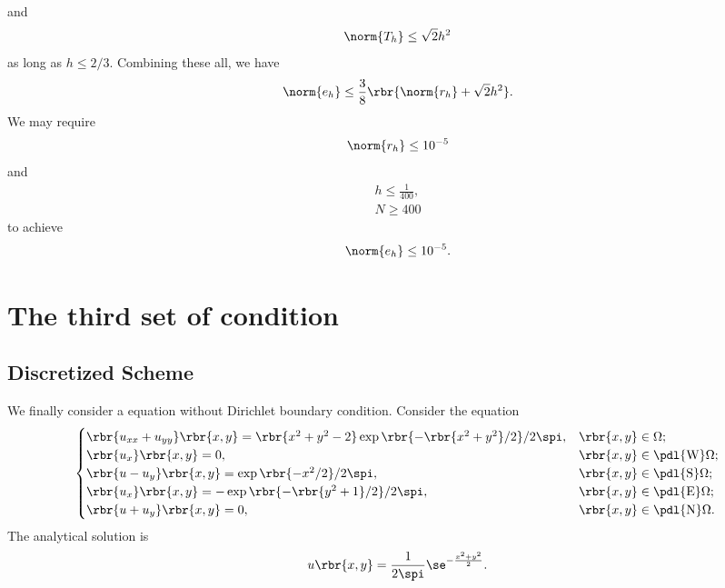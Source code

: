 \documentclass[english, nochinese]{pnote}
\begin{document}
and
\begin{equation}
\norm{T_h} \le \sqrt{2} h^2
\end{equation}
as long as $ h \le 2 / 3 $. Combining these all, we have
\begin{equation}
\norm{e_h} \le \frac{3}{8} \rbr{ \norm{r_h} + \sqrt{2} h^2 }.
\end{equation}
We may require
\begin{equation}
\norm{r_h} \le 10^{-5}
\end{equation}
and
\begin{gather}
h \le \frac{1}{400}, \\
N \ge 400
\end{gather}
to achieve
\begin{equation}
\norm{e_h} \le 10^{-5}.
\end{equation}

\section{The third set of condition}

\subsection{Discretized Scheme}

We finally consider a equation without Dirichlet boundary condition. Consider the equation
\begin{equation}
\begin{cases}
\rbr{ u_{ x x } + u_{ y y } } \rbr{ x, y } = \rbr{ x^2 + y^2 - 2 } \exp \rbr{ -\rbr{ x^2 + y^2 } / 2 } / 2 \spi, & \rbr{ x, y } \in \Omega; \\
\rbr{u_x} \rbr{ x, y } = 0, & \rbr{ x, y } \in \pdl{\text{W}} \Omega; \\
\rbr{ u - u_y } \rbr{ x, y }  = \exp \rbr{ -x^2 / 2 } / 2 \spi, & \rbr{ x, y } \in \pdl{\text{S}} \Omega; \\
\rbr{u_x} \rbr{ x, y } = -\exp \rbr{ -\rbr{ y^2 + 1 } / 2 } / 2 \spi, & \rbr{ x, y } \in \pdl{\text{E}} \Omega; \\
\rbr{ u + u_y } \rbr{ x, y } = 0, & \rbr{ x, y } \in \pdl{\text{N}} \Omega.
\end{cases}
\end{equation}
The analytical solution is
\begin{equation}
u \rbr{ x, y } = \frac{1}{ 2 \spi } \se^{-\frac{ x^2 + y^2 }{2}}.
\end{equation}
\end{document}
